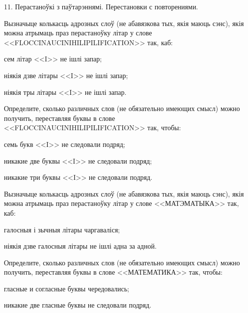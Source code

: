 



\biLangHeader
{11. Перастаноўкі з паўтарэннямі.}
{Перестановки с повторениями.}

\begin{problemList}

\problemItemSimple
{%
Вызначыце колькасць адрозных слоў (не абавязкова тых, якія маюць сэнс), якія можна атрымаць
праз перастаноўку літар у слове <<FLOCCINAUCINIHILIPILIFICATION>> так, каб:
\begin{belarusianEnumerate}
    \item сем літар <<I>> не ішлі запар;
    \item ніякія дзве літары <<I>> не ішлі запар;
    \item ніякія тры літары <<I>> не ішлі запар.
\end{belarusianEnumerate}
}
{%
Определите, сколько различных слов (не обязательно имеющих смысл) можно
получить, переставляя буквы в слове <<FLOCCINAUCINIHILIPILIFICATION>>
так, чтобы:
\begin{russianEnumerate}
    \item семь букв <<I>> не следовали подряд;
    \item никакие две буквы <<I>> не следовали подряд;
    \item никакие три буквы <<I>> не следовали подряд.
\end{russianEnumerate}
}

\bigskip

\problemItemSimple
{%
Вызначыце колькасць адрозных слоў (не абавязкова тых, якія маюць сэнс), якія можна атрымаць
праз перастаноўку літар у слове <<МАТЭМАТЫКА>> так, каб:
\begin{belarusianEnumerate}
    \item галосныя і зычныя літары чаргаваліся;
    \item ніякія дзве галосныя літары не ішлі адна за адной.
\end{belarusianEnumerate}
}
{%
Определите, сколько различных слов (не обязательно имеющих смысл) можно
получить, переставляя буквы в слове <<МАТЕМАТИКА>>
так, чтобы:
\begin{russianEnumerate}
    \item гласные и согласные буквы чередовались;
    \item никакие две гласные буквы не следовали подряд.
\end{russianEnumerate}
}

\bigskip


\end{problemList}
